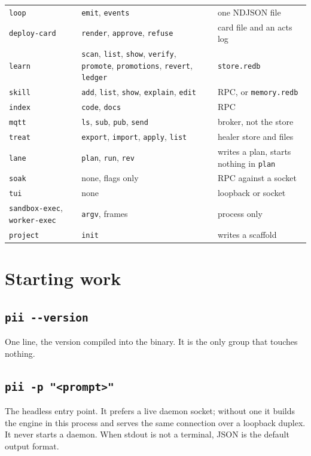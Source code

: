 \begin{longtable}{@{}>{\raggedright\arraybackslash}p{}>{\raggedright\arraybackslash}p{}>{\raggedright\arraybackslash}p{}@{}}
  \texttt{loop} & \texttt{emit}, \texttt{events} & one NDJSON file \\
  \texttt{deploy-card} & \texttt{render}, \texttt{approve}, \texttt{refuse} & card file and an acts log \\
  \texttt{learn} & \texttt{scan}, \texttt{list}, \texttt{show}, \texttt{verify}, \texttt{promote}, \texttt{promotions}, \texttt{revert}, \texttt{ledger} & \texttt{store.redb} \\
  \texttt{skill} & \texttt{add}, \texttt{list}, \texttt{show}, \texttt{explain}, \texttt{edit} & RPC, or \texttt{memory.redb} \\
  \texttt{index} & \texttt{code}, \texttt{docs} & RPC \\
  \texttt{mqtt} & \texttt{ls}, \texttt{sub}, \texttt{pub}, \texttt{send} & broker, not the store \\
  \texttt{treat} & \texttt{export}, \texttt{import}, \texttt{apply}, \texttt{list} & healer store and files \\
  \texttt{lane} & \texttt{plan}, \texttt{run}, \texttt{rev} & writes a plan, starts nothing in \texttt{plan} \\
  \texttt{soak} & none, flags only & RPC against a socket \\
  \texttt{tui} & none & loopback or socket \\
  \texttt{sandbox-exec}, \texttt{worker-exec} & \texttt{argv}, frames & process only \\
  \texttt{project} & \texttt{init} & writes a scaffold \\
  \bottomrule
\end{longtable}

\section{Starting work}

\subsection*{\texttt{pii -{}-version}}

One line, the version compiled into the binary. It is the only group that touches nothing.

\subsection*{\texttt{pii -p "<prompt>"}}

The headless entry point. It prefers a live daemon socket; without one it builds the engine
in this process and serves the same connection over a loopback duplex. It never starts a
daemon. When stdout is not a terminal, JSON is the default output format.

